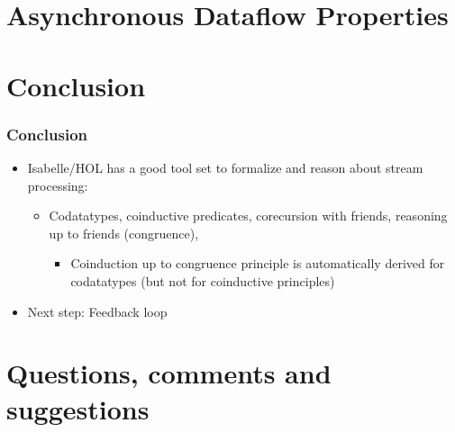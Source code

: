 \documentclass[aspectratio=169,10pt]{beamer}
\begin{document}
\section{Asynchronous Dataflow Properties}

\section{Conclusion}

\begin{frame}
  \frametitle{Conclusion}
  \begin{itemize}
    \item Isabelle/HOL has a good tool set to formalize and reason about stream processing:
          \begin{itemize}
            \item Codatatypes, coinductive predicates, corecursion with friends, reasoning up to friends (congruence),
                  \begin{itemize}
                    \item Coinduction up to congruence principle is automatically derived for codatatypes (but not for coinductive principles)
                  \end{itemize}
          \end{itemize}
    \item Next step: Feedback loop
  \end{itemize}
\end{frame}

\section{Questions, comments and suggestions}
\end{document}
